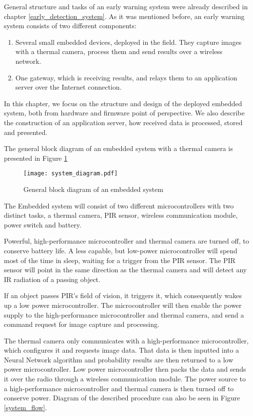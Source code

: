 General structure and tasks of an early warning system were already described in chapter \ref{early_detection_system}.
As it was mentioned before, an early warning system consists of two different components:

\begin{enumerate} 
    \item Several small embedded devices, deployed in the field. They capture images with a thermal camera, process them and send results over a wireless network.
    \item One gateway, which is receiving results, and relays them to an application server over the Internet connection.
\end{enumerate} 

In this chapter, we focus on the structure and design of the deployed embedded system, both from hardware and firmware point of perspective.
We also describe the construction of an application server, how received data is processed, stored and presented.

The general block diagram of an embedded system with a thermal camera is presented in Figure \ref{system_diagram} 

\begin{figure}[ht]
        \centering
        \texttt{[image: system\_diagram.pdf]} 
        \caption{ General block diagram of an embedded system}
        \label{system_diagram}
\end{figure}

The Embedded system will consist of two different microcontrollers with two distinct tasks, a thermal camera, PIR sensor, wireless communication module, power switch and battery.

Powerful, high-performance microcontroller and thermal camera are turned off, to conserve battery life.
A less capable, but low-power microcontroller will spend most of the time in sleep, waiting for a trigger from the PIR sensor.
The PIR sensor will point in the same direction as the thermal camera and will detect any IR radiation of a passing object.

If an object passes PIR's field of vision, it triggers it, which consequently wakes up a low power microcontroller.
The microcontroller will then enable the power supply to the high-performance microcontroller and thermal camera, and send a command request for image capture and processing.

The thermal camera only communicates with a high-performance microcontroller, which configures it and requests image data.
That data is then inputted into a Neural Network algorithm and probability results are then returned to a low power microcontroller.
Low power microcontroller then packs the data and sends it over the radio through a wireless communication module.
The power source to a high-performance microcontroller and thermal camera is then turned off to conserve power.
Diagram of the described procedure can also be seen in Figure \ref{system_flow}.

